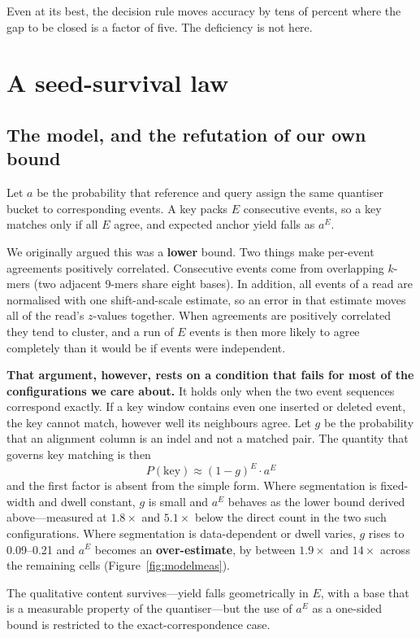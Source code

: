 \documentclass[conference]{IEEEtran}
\begin{document}
Even at its best, the decision rule moves accuracy by tens of percent where the gap to be closed
is a factor of five. The deficiency is not here.

\section{A seed-survival law}
\label{sec:law}

\subsection{The model, and the refutation of our own bound}

Let $a$ be the probability that reference and query assign the same quantiser bucket to
corresponding events. A key packs $E$ consecutive events, so a key matches only if all $E$
agree, and expected anchor yield falls as $a^{E}$.

We originally argued this was a \textbf{lower} bound. Two things make per-event agreements
positively correlated. Consecutive events come from overlapping $k$-mers (two adjacent 9-mers
share eight bases). In addition, all events of a read are normalised with one shift-and-scale
estimate, so an error in that estimate moves all of the read's $z$-values together. When
agreements are positively correlated they tend to cluster, and a run of $E$ events is then more
likely to agree completely than it would be if events were independent.

\textbf{That argument, however, rests on a condition that fails for most of the configurations
we care about.} It holds only when the two event sequences correspond exactly. If a key window
contains even one inserted or deleted event, the key cannot match, however well its neighbours
agree. Let $g$ be the probability that an alignment column is an indel and not a matched pair.
The quantity that governs key matching is then
\[ P(\mathrm{key}) \approx (1-g)^{E} \cdot a^{E} \]
and the first factor is absent from the simple form. Where segmentation is fixed-width and dwell
constant, $g$ is small and $a^{E}$ behaves as the lower bound derived above---measured at $1.8\times$
and $5.1\times$ below the direct count in the two such configurations. Where segmentation is
data-dependent or dwell varies, $g$ rises to 0.09--0.21 and $a^{E}$ becomes an
\textbf{over-estimate}, by between $1.9\times$ and $14\times$ across the remaining cells
(Figure~\ref{fig:modelmeas}).

The qualitative content survives---yield falls geometrically in $E$, with a base that is a
measurable property of the quantiser---but the use of $a^{E}$ as a one-sided bound is restricted
to the exact-correspondence case.
\end{document}
